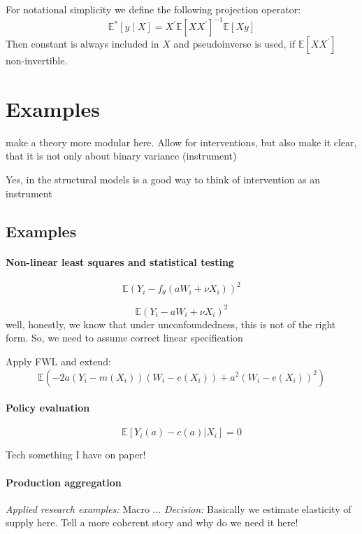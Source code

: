 \documentclass[a4paper,12pt]{article}
\theoremstyle{plain}
\begin{document}
For notational simplicity we define the following projection operator: %
\begin{equation}
    \mathbb{E}^\ast[y \mid X] = X^\prime \mathbb{E}[XX^\prime]^{-1}\mathbb{E}[Xy]
\end{equation}
Then constant is always included in $X$ and pseudoinverse is used, if $\mathbb{E}[XX^\prime]$ non-invertible.

    


\section{Examples}

make a theory more modular here. Allow for interventions, but also make it clear, that it is not only about binary variance (instrument)

Yes, in the structural models is a good way to think of intervention as an instrument

\subsection{Examples}

\paragraph{Non-linear least squares and statistical testing}

$$\mathbb{E}(Y_i - f_\theta(aW_i + \nu X_i))^2$$ 

$$\mathbb{E}(Y_i - aW_i + \nu X_i)^2$$ 
well, honestly, we know that under unconfoundedness, this is not of the right form. So, we need to assume correct linear specification

Apply FWL and extend:
$$\mathbb{E}( -2a(Y_i - m(X_i))(W_i - e(X_i)) + a^2(W_i - e(X_i))^2)$$ 

\paragraph{Policy evaluation}
$$\mathbb{E}[Y_i(a) - c(a) | X_i] = 0$$

Tech something I have on paper!

\paragraph{Production aggregation}

\textit{Applied research examples:} Macro ... \cite{}
\textit{Decision:} Basically we estimate elasticity of supply here. Tell a more coherent story and why do we need it here!
\end{document}
